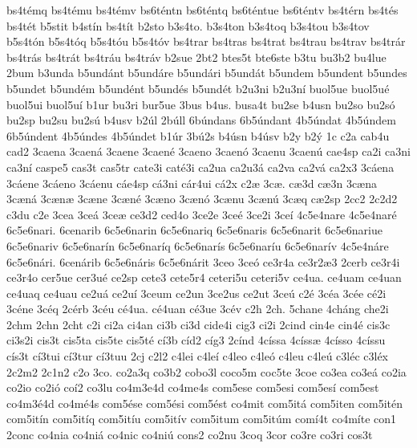 {bs4t^^e9mq
bs4t^^e9mu
bs4t^^e9mv
bs6t^^e9ntn
bs6t^^e9ntq
bs6t^^e9ntue
bs6t^^e9ntv
bs4t^^e9rn
bs4t^^e9s
bs4t^^e9t
b5stit
b4st^^edn
bs4t^^edt
b2sto
b3s4to.
b3s4ton
b3s4toq
b3s4tou
b3s4tov
b5s4t^^f3n
b5s4t^^f3q
b5s4t^^f3u
b5s4t^^f3v
bs4trar
bs4tras
bs4trat
bs4trau
bs4trav
bs4tr^^e1r
bs4tr^^e1s
bs4tr^^e1t
bs4tr^^e1u
bs4tr^^e1v
b2sue
2bt2
btes5t
bte6ste
b3tu
bu3b2
bu4lue
2bum
b3unda
b5und^^e1nt
b5und^^e1re
b5und^^e1ri
b5und^^e1t
b5undem
b5undent
b5undes
b5undet
b5und^^e9m
b5und^^e9nt
b5und^^e9s
b5und^^e9t
b2u3ni
b2u3n^^ed
buol5ue
buol5u^^e9
buol5ui
buol5u^^ed
b1ur
bu3ri
bur5ue
3bus
b4us.
busa4t
bu2se
b4usn
bu2so
bu2s^^f3
bu2sp
bu2su
bu2s^^fa
b4usv
b2^^fal
2b^^fall
6b^^fandans
6b5^^fandant
4b5^^fandat
4b5^^fandem
6b5^^fandent
4b5^^fandes
4b5^^fandet
b1^^far
3b^^fa2s
b4^^fasn
b4^^fasv
b2y
b2^^fd
1c
c2a
cab4u
cad2
3caena
3caen^^e1
3caene
3caen^^e9
3caeno
3caen^^f3
3caenu
3caen^^fa
cae4sp
ca2i
ca3ni
ca3n^^ed
caspe5
cas3t
cas5tr
cate3i
cat^^e93i
ca2ua
ca2u3^^e1
ca2va
ca2v^^e1
ca2x3
3c^^e1ena
3c^^e1ene
3c^^e1eno
3c^^e1enu
c^^e1e4sp
c^^e13ni
c^^e1r4ui
c^^e12x
c2^^e6
3c^^e6.
c^^e63d
c^^e63n
3c^^e6na
3c^^e6n^^e1
3c^^e6n^^e6
3c^^e6ne
3c^^e6n^^e9
3c^^e6no
3c^^e6n^^f3
3c^^e6nu
3c^^e6n^^fa
3c^^e6q
c^^e62sp
2cc2
2c2d2
c3du
c2e
3cea
3ce^^e1
3ce^^e6
ce3d2
ced4o
3ce2e
3ce^^e9
3ce2i
3ce^^ed
4c5e4nare
4c5e4nar^^e9
6c5e6nari.
6cenarib
6c5e6narin
6c5e6nariq
6c5e6naris
6c5e6narit
6c5e6nariue
6c5e6nariv
6c5e6nar^^edn
6c5e6nar^^edq
6c5e6nar^^eds
6c5e6nar^^edu
6c5e6nar^^edv
4c5e4n^^e1re
6c5e6n^^e1ri.
6cen^^e1rib
6c5e6n^^e1ris
6c5e6n^^e1rit
3ceo
3ce^^f3
ce3r4a
ce3r2^^e63
2cerb
ce3r4i
ce3r4o
cer5ue
cer3u^^e9
ce2sp
cete3
cete5r4
ceteri5u
ceteri5v
ce4ua.
ce4uam
ce4uan
ce4uaq
ce4uau
ce2u^^e1
ce2u^^ed
3ceum
ce2un
3ce2us
ce2ut
3ce^^fa
c2^^e9
3c^^e9a
3c^^e9e
c^^e92i
3c^^e9ne
3c^^e9q
2c^^e9rb
3c^^e9u
c^^e94ua.
c^^e94uan
c^^e93ue
3c^^e9v
c2h
2ch.
5chane
4ch^^e1ng
che2i
2chm
2chn
2cht
c2i
ci2a
ci4an
ci3b
ci3d
cide4i
cig3
ci2i
2cind
cin4e
cin4^^e9
cis3c
ci3s2i
cis3t
cis5ta
cis5te
cis5t^^e9
c^^ed3b
c^^edd2
c^^edg3
2c^^ednd
4c^^edssa
4c^^edss^^e6
4c^^edsso
4c^^edssu
c^^eds3t
c^^ed3tui
c^^ed3tur
c^^ed3tuu
2cj
c2l2
c4lei
c4le^^ed
c4leo
c4le^^f3
c4leu
c4le^^fa
c3l^^e9c
c3l^^e9x
2c2m2
2c1n2
c2o
3co.
co2a3q
co3b2
cobo3l
coco5m
coc5te
3coe
co3ea
co3e^^e1
co2ia
co2io
co2i^^f3
co^^ed2
co3lu
co4m3e4d
co4me4s
com5ese
com5esi
com5es^^ed
com5est
co4m3^^e94d
co4m^^e94s
com5^^e9se
com5^^e9si
com5^^e9st
co4mit
com5it^^e1
com5iten
com5it^^e9n
com5it^^edn
com5it^^edq
com5it^^edu
com5it^^edv
com5itum
com5it^^fam
com^^ed4t
co4m^^edte
con1
2conc
co4nia
co4ni^^e1
co4nic
co4ni^^fa
cons2
co2nu
3coq
3cor
co3re
co3ri
cos3t
}
